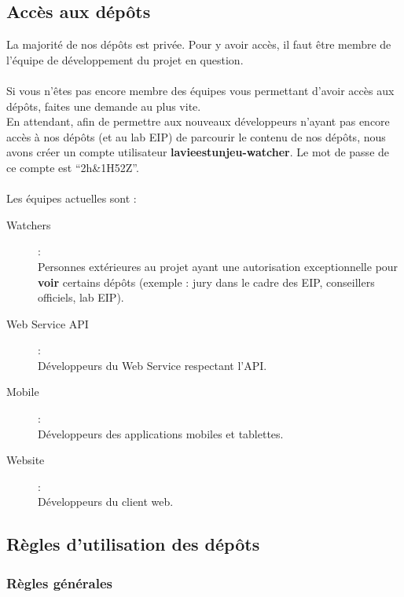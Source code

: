 \documentclass{life-fr}
\begin{document}
\subsection{Accès aux dépôts}

La majorité de nos dépôts est privée. Pour y avoir accès, il faut être membre
de l'équipe de développement du projet en question.\\
\\
Si vous n'êtes pas encore membre des équipes vous permettant d'avoir accès
aux dépôts, faites une demande au plus vite.\\
En attendant, afin de permettre aux nouveaux développeurs n'ayant pas encore
accès à nos dépôts (et au lab EIP) de parcourir le contenu de nos dépôts,
nous avons créer un compte utilisateur \textbf{lavieestunjeu-watcher}. Le
mot de passe de ce compte est ``2h\&1H52Z''.\\
\\
Les équipes actuelles sont :
\begin{description}
  \item [Watchers] : \\
    Personnes extérieures au projet ayant une autorisation exceptionnelle
    pour \textbf{voir} certains dépôts (exemple : jury dans le cadre des
    EIP, conseillers officiels, lab EIP).
  \item [Web Service API] : \\
    Développeurs du Web Service respectant l'API.
  \item [Mobile] : \\
    Développeurs des applications mobiles et tablettes.
  \item [Website] : \\
    Développeurs du client web.
\end{description}

\subsection{Règles d'utilisation des dépôts}

\subsubsection{Règles générales}
\end{document}
